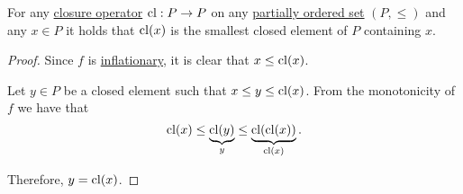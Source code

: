 \begin{proposition}\label{thm:closure_operator_minimality}
  For any \hyperref[def:closure_operator]{closure operator} \( \operatorname{cl}: P \to P \) on any \hyperref[def:partially_ordered_set]{partially ordered set} \( (P, \leq) \) and any \( x \in P \) it holds that \( \operatorname{cl}(x) \) is the smallest closed element of \( P \) containing \( x \).
\end{proposition}
\begin{proof}
  Since \( f \) is \hyperref[def:inflationary_function]{inflationary}, it is clear that \( x \leq \operatorname{cl}(x) \).

  Let \( y \in P \) be a closed element such that \( x \leq y \leq \operatorname{cl}(x) \). From the monotonicity of \( f \) we have that
  \begin{equation*}
    \operatorname{cl}(x) \leq \underbrace{\operatorname{cl}(y)}_{y} \leq \underbrace{\operatorname{cl}(\operatorname{cl}(x))}_{\operatorname{cl}(x)}.
  \end{equation*}

  Therefore, \( y = \operatorname{cl}(x) \).
\end{proof}

